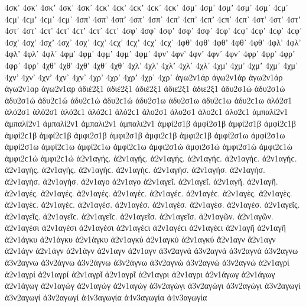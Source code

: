 {4σκ' 4σκ’ 4σκʼ 4σκ᾽ 4σκ᾿ 4ϲκ' 4ϲκ’ 4ϲκʼ 4ϲκ᾽ 4ϲκ᾿ 
4σμ' 4σμ’ 4σμʼ 4σμ᾽ 4σμ᾿ 4ϲμ' 4ϲμ’ 4ϲμʼ 4ϲμ᾽ 4ϲμ᾿ 
4σπ' 4σπ’ 4σπʼ 4σπ᾽ 4σπ᾿ 4ϲπ' 4ϲπ’ 4ϲπʼ 4ϲπ᾽ 4ϲπ᾿ 
4στ' 4στ’ 4στʼ 4στ᾽ 4στ᾿ 4ϲτ' 4ϲτ’ 4ϲτʼ 4ϲτ᾽ 4ϲτ᾿ 
4σφ' 4σφ’ 4σφʼ 4σφ᾽ 4σφ᾿ 4ϲφ' 4ϲφ’ 4ϲφʼ 4ϲφ᾽ 4ϲφ᾿ 
4σχ' 4σχ’ 4σχʼ 4σχ᾽ 4σχ᾿ 4ϲχ' 4ϲχ’ 4ϲχʼ 4ϲχ᾽ 4ϲχ᾿ 
%
4φθ' 4φθ’ 4φθʼ 4φθ᾽ 4φθ᾿ 
4φλ' 4φλ’ 4φλʼ 4φλ᾽ 4φλ᾿ 
4φμ' 4φμ’ 4φμʼ 4φμ᾽ 4φμ᾿ 
4φν' 4φν’ 4φνʼ 4φν᾽ 4φν᾿ 
4φρ' 4φρ’ 4φρʼ 4φρ᾽ 4φρ᾿ 
%
4χθ' 4χθ’ 4χθʼ 4χθ᾽ 4χθ᾿ 
4χλ' 4χλ’ 4χλʼ 4χλ᾽ 4χλ᾿ 
4χμ' 4χμ’ 4χμʼ 4χμ᾽ 4χμ᾿ 
4χν' 4χν’ 4χνʼ 4χν᾽ 4χν᾿ 
4χρ' 4χρ’ 4χρʼ 4χρ᾽ 4χρ᾿ 
%
ἀγω2ν1άρ ἀγω2ν1άρ ἀγω2ν1άρ   %
ἀγω2ν1αρ ἀγω2ν1αρ 
ἀδιέ2ξ1 ἀδιέ2ξ1 ἀδιέ2ξ1   %
ἀδιε2ξ1 ἀδιε2ξ1 
ἀδυ2σ1ώ ἀδυ2σ1ώ ἀδυ2σ1ώ ἀδυ2ϲ1ώ ἀδυ2ϲ1ώ ἀδυ2ϲ1ώ   %
ἀδυ2σ1ω ἀδυ2σ1ω ἀδυ2ϲ1ω ἀδυ2ϲ1ω 
ἁλό2σ1 ἁλό2σ1 ἁλό2σ1 ἁλό2ϲ1 ἁλό2ϲ1 ἁλό2ϲ1   %
ἁλο2σ1 ἁλο2σ1 ἁλο2ϲ1 ἁλο2ϲ1 
ἀμπαλί2ν1 ἀμπαλί2ν1 ἀμπαλί2ν1   %
ἀμπαλι2ν1 ἀμπαλι2ν1 
ἀμφί2σ1β ἀμφί2σ1β ἀμφί2σ1β ἀμφί2ϲ1β ἀμφί2ϲ1β ἀμφί2ϲ1β   %
ἀμφι2σ1β ἀμφι2σ1β ἀμφι2ϲ1β ἀμφι2ϲ1β 
ἀμφί2σ1ω ἀμφί2σ1ω ἀμφί2σ1ω ἀμφί2ϲ1ω ἀμφί2ϲ1ω ἀμφί2ϲ1ω   %
ἀμφι2σ1ώ ἀμφι2σ1ώ ἀμφι2σ1ώ ἀμφι2ϲ1ώ ἀμφι2ϲ1ώ ἀμφι2ϲ1ώ 
ἀ2ν1αγής. ἀ2ν1αγής. ἀ2ν1αγής. ἀ2ν1αγήϲ. ἀ2ν1αγήϲ. ἀ2ν1αγήϲ.   %
ἀ2ν1αγὴς. ἀ2ν1αγὴς. ἀ2ν1αγὴϲ. ἀ2ν1αγὴϲ. 
ἀ2ν1αγήσ. ἀ2ν1αγήσ. ἀ2ν1αγήσ. 
ἀ2ν1αγὴσ. ἀ2ν1αγὴσ. 
ἀ2ν1αγο ἀ2ν1αγο 
ἀ2ν1αγεῖ. ἀ2ν1αγεῖ. 
ἀ2ν1αγῆ. ἀ2ν1αγῆ. 
ἀ2ν1αγές. ἀ2ν1αγές. ἀ2ν1αγές. ἀ2ν1αγέϲ. ἀ2ν1αγέϲ. ἀ2ν1αγέϲ. 
ἀ2ν1αγὲς. ἀ2ν1αγὲς. ἀ2ν1αγὲϲ. ἀ2ν1αγὲϲ. 
ἀ2ν1αγέσ. ἀ2ν1αγέσ. ἀ2ν1αγέσ. 
ἀ2ν1αγὲσ. ἀ2ν1αγὲσ. 
ἀ2ν1αγεῖς. ἀ2ν1αγεῖς. ἀ2ν1αγεῖϲ. ἀ2ν1αγεῖϲ. 
ἀ2ν1αγεῖσ. ἀ2ν1αγεῖσ. 
ἀ2ν1αγῶν. ἀ2ν1αγῶν. 
ἀ2ν1αγέσι ἀ2ν1αγέσι ἀ2ν1αγέσι ἀ2ν1αγέϲι ἀ2ν1αγέϲι ἀ2ν1αγέϲι 
ἀ2ν1αγῆ ἀ2ν1αγῆ 
ἀ2ν1άγκυ ἀ2ν1άγκυ ἀ2ν1άγκυ   %
ἀ2ν1αγκύ ἀ2ν1αγκύ ἀ2ν1αγκύ 
ἄ2ν1αγν ἄ2ν1αγν   %
ἀ2ν1άγν ἀ2ν1άγν ἀ2ν1άγν 
ἀ2ν1αγν ἀ2ν1αγν   %
ἀ3ν2αγνά ἀ3ν2αγνά ἀ3ν2αγνά   %
ἀ3ν2αγνω ἀ3ν2αγνω   %
ἀ3ν2άγνω ἀ3ν2άγνω ἀ3ν2άγνω   %
ἀ3ν2αγνώ ἀ3ν2αγνώ ἀ3ν2αγνώ 
ἀ2ν1αγρί ἀ2ν1αγρί ἀ2ν1αγρί   %
ἀ2ν1αγρῖ ἀ2ν1αγρῖ   %
ἀ2ν1αγρι ἀ2ν1αγρι   %
ἀ2ν1άγωγ ἀ2ν1άγωγ ἀ2ν1άγωγ   %
ἀ2ν1αγώγ ἀ2ν1αγώγ ἀ2ν1αγώγ 
ἀ3ν2αγώγι ἀ3ν2αγώγι ἀ3ν2αγώγι   %
ἀ3ν2αγωγί ἀ3ν2αγωγί ἀ3ν2αγωγί 
ἀ4ν3αγωγία ἀ4ν3αγωγία ἀ4ν3αγωγία   %
}
